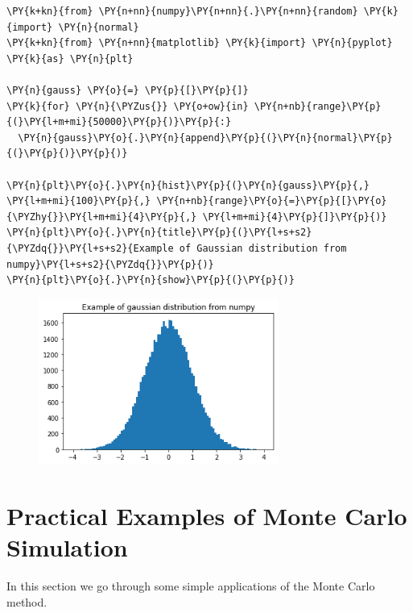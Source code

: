  \begin{tcolorbox}[breakable, size=fbox, boxrule=1pt, pad at break*=1mm,colback=cellbackground, colframe=cellborder]
\begin{Verbatim}[commandchars=\\\{\}]
\PY{k+kn}{from} \PY{n+nn}{numpy}\PY{n+nn}{.}\PY{n+nn}{random} \PY{k}{import} \PY{n}{normal}
\PY{k+kn}{from} \PY{n+nn}{matplotlib} \PY{k}{import} \PY{n}{pyplot} \PY{k}{as} \PY{n}{plt}

\PY{n}{gauss} \PY{o}{=} \PY{p}{[}\PY{p}{]}
\PY{k}{for} \PY{n}{\PYZus{}} \PY{o+ow}{in} \PY{n+nb}{range}\PY{p}{(}\PY{l+m+mi}{50000}\PY{p}{)}\PY{p}{:}
  \PY{n}{gauss}\PY{o}{.}\PY{n}{append}\PY{p}{(}\PY{n}{normal}\PY{p}{(}\PY{p}{)}\PY{p}{)}
  
\PY{n}{plt}\PY{o}{.}\PY{n}{hist}\PY{p}{(}\PY{n}{gauss}\PY{p}{,} \PY{l+m+mi}{100}\PY{p}{,} \PY{n+nb}{range}\PY{o}{=}\PY{p}{[}\PY{o}{\PYZhy{}}\PY{l+m+mi}{4}\PY{p}{,} \PY{l+m+mi}{4}\PY{p}{]}\PY{p}{)}
\PY{n}{plt}\PY{o}{.}\PY{n}{title}\PY{p}{(}\PY{l+s+s2}{\PYZdq{}}\PY{l+s+s2}{Example of Gaussian distribution from numpy}\PY{l+s+s2}{\PYZdq{}}\PY{p}{)}
\PY{n}{plt}\PY{o}{.}\PY{n}{show}\PY{p}{(}\PY{p}{)}
\end{Verbatim}
\end{tcolorbox}

    \begin{figure}
    \centering
    \includegraphics[width=0.7\textwidth]{lecture_6_files/lecture_6_32_0.png}
    \end{figure}

\section{Practical Examples of Monte Carlo
Simulation}\label{example-of-monte-carlo-simulation}

In this section we go through some simple applications of the Monte Carlo method.

